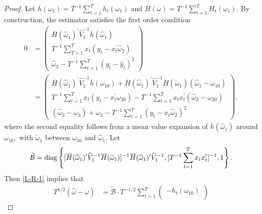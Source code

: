 \begin{proof}
Let $\overline{h}(\omega _{1})=T^{-1}\sum_{t=1}^{T}h_{t}(\omega _{1})$ and $ \overline{H}(\omega )=T^{-1}\sum_{t=1}^{T}H_{t}(\omega _{1}).$ By construction, the estimator satisfies the first order condition
%
\begin{align}
    0 &= 
    \begin{pmatrix} 
        \overline{H}(\widehat{\omega }_{1})^{\prime }\widehat{V}_{1}^{-1}\overline{h} (\widehat{\omega }_{1}) \\ 
%
        T^{-1}\sum_{T=1}^{T}x_{t}(y_{t}-x_{t}^{\prime }\widehat{\omega }_{2}) \\ 
%
        \widehat{\omega }_{3}-T^{-1}\sum_{t=1}^{T}\left( y_{t}-\widehat{y} _{t}\right) ^{2} 
    \end{pmatrix} \nonumber \\ 
%
    &= 
%
    \begin{pmatrix}
%
        \overline{H}(\widehat{\omega }_{1})^{\prime }\widehat{V}_{1}^{-1}\overline{h} (\omega _{10})+\overline{H}(\widehat{\omega }_{1})^{\prime }\widehat{V} _{1}^{-1}\overline{H}(\widetilde{\omega }_{1})(\widehat{\omega }_{1}-\omega
_{10}) \\ 
%
        T^{-1}\sum_{t=1}^{T}x_{t}(y_{t}-x_{t}^{\prime }\omega _{20})-T^{-1}\sum_{t=1}^{T}x_{t}x_{t}^{\prime }\left( \widehat{\omega } _{2}-\omega _{20}\right) \\ 
%
        \left( \widehat{\omega }_{3}-\omega _{3}\right) +\omega _{3}-T^{-1}\sum_{t=1}^{T}\left( y_{t}-x_{t}\widehat{\omega }_{2}\right) ^{2}
    \end{pmatrix},
%
  \label{L-R-1}
\end{align}
%
where the second equality follows from a mean value expansion of $\overline{h }(\widehat{\omega }_{1})$ around $\omega _{10},$ with $\widetilde{\omega } _{1}$ between $\omega _{10}$ and $\widehat{\omega }_{1}$. 
Let
%
\begin{equation}
%
    \widetilde{\mathcal{B}} = \diag\left\lbrace[\overline{H}(\widehat{\omega }_{1})^{\prime } \widehat{V}_{1}^{-1}\overline{H}(\widetilde{\omega }_{1})]^{-1}\overline{H}( \widehat{\omega }_{1})^{\prime }\widehat{V}_{1}^{-1},[T^{-1} \sum_{t=1}^{T}x_{t}x_{t}^{\prime }]^{-1},1\right\rbrace.  
%
\end{equation}
%
Then \cref{L-R-1} implies that 
%
\begin{align}
    T^{1/2}\left( \widehat{\omega }-\omega \right) 
%    
    &= \widetilde{\mathcal{B}} \cdot T^{-1/2}\sum_{t=1}^{T} 
%
    \begin{pmatrix}
        -h_{t}(\omega _{10}) \\ 

\end{pmatrix}
\end{align}
\end{proof}
